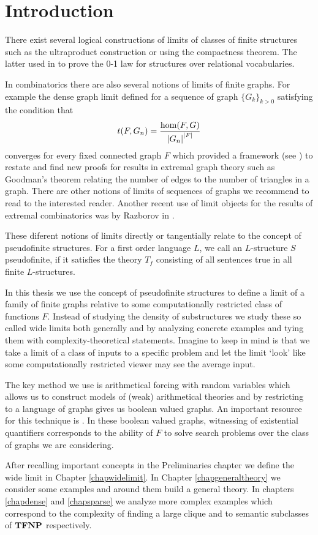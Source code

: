 \chapter*{Introduction}

There exist several logical constructions of limits of classes of finite structures such as the ultraproduct construction or using the compactness theorem. The latter used in \cite{Fagin1976} to prove the 0-1 law for structures over relational vocabularies.

In combinatorics there are also several notions of limits of finite graphs. For example the dense graph limit defined for a sequence of graph $\{G_k\}_{k>0}$ satisfying the condition that
\[t(F,G_n)=\frac{\hom(F,G)}{\left|{G_n}\right|^{\left|{F}\right|}}\]
converges for every fixed connected graph $F$ which provided a framework (see \cite{lovasz2006limits}) to restate and find new proofs for results in extremal graph theory such as Goodman's theorem relating the number of edges to the number of triangles in a graph. There are other notions of limits of sequences of graphs we recommend to read \cite{Nesetril2013} to the interested reader. Another recent use of limit objects for the results of extremal combinatorics was by Razborov in \cite{razborov2007flag}.

These diferent notions of limits directly or tangentially relate to the concept of pseudofinite structures. For a first order language $L$, we call an $L$-structure $S$ pseudofinite, if it satisfies the theory $T_f$ consisting of all sentences true in all finite $L$-structures.

In this thesis we use the concept of pseudofinite structures to define a limit of a family of finite graphs relative to some computationally restricted class of functions $F$. Instead of studying the density of substructures we study these so called wide limits both generally and by analyzing concrete examples and tying them with complexity-theoretical statements. Imagine to keep in mind is that we take a limit of a class of inputs to a specific problem and let the limit `look' like some computationally restricted viewer may see the average input.

The key method we use is arithmetical forcing with random variables which allows us to construct models of (weak) arithmetical theories and by restricting to a language of graphs gives us boolean valued graphs. An important resource for this technique is \cite{krajicek2010forcing}. In these boolean valued graphs, witnessing of existential quantifiers corresponds to the ability of $F$ to solve search problems over the class of graphs we are considering.

After recalling important concepts in the Preliminaries chapter we define the wide limit in Chapter \ref{chapwidelimit}. In Chapter \ref{chapgeneraltheory} we consider some examples and around them build a general theory. In chapters \ref{chapdense} and \ref{chapsparse} we analyze more complex examples which correspond to the complexity of finding a large clique and to semantic subclasses of $\textbf{TFNP}$ respectively. 
